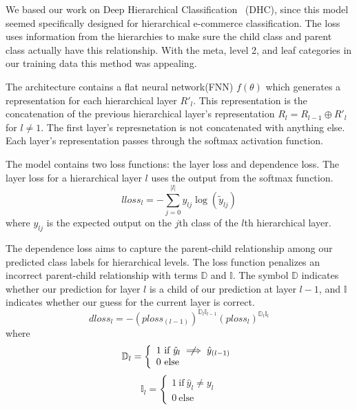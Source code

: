 \documentclass[conference]{IEEEtran}
\begin{document}
We based our work on Deep Hierarchical Classification~\cite{gao2020deep} (DHC), since this model seemed 
specifically designed for hierarchical e-commerce classification.
The loss uses information from the hierarchies to make sure the child class and parent class actually
have this relationship.
With the meta, level 2, and leaf categories in our training data this method was appealing.

The architecture contains a flat neural network(FNN) $f(\theta)$ which generates a representation 
for each hierarchical layer $R'_l$. 
This representation is the concatenation of the previous hierarchical layer's representation
$R_l = R_{l-1}\oplus R'_l$ for $ l\neq 1$. 
The first layer's represnetation is not concatenated with anything else.
Each layer's representation passes through the softmax activation function.

The model contains two loss functions: the layer loss and dependence loss.
The layer loss for a hierarchical layer $l$ uses the output from the softmax 
function. 
\begin{equation}
		lloss_l = -\sum_{j=0}^{|l|} y_{lj} \log (\tilde{y}_{lj})
		\label{eq:lloss}
\end{equation}
where $y_{lj}$ is the expected output on the $j$th class of the $l$th hierarchical layer.

The dependence loss aims to capture the parent-child relationship among our predicted class labels
for hierarchical levels.
The loss function penalizes an incorrect parent-child relationship with terms $\mathbb{D}$ and $\mathbb{I}$.
The symbol $\mathbb{D}$ indicates whether our prediction for layer $l$ is a child of our prediction at layer $l-1$,
and $\mathbb{I}$ indicates whether our guess for the current layer is correct.
\begin{equation}
		dloss_l = -(ploss_{(l-1)})^{\mathbb{D}_{l}\mathbb{I}_{l-1}}(ploss_l)^{\mathbb{D}_l\mathbb{I}_l}
\end{equation}
where
\begin{equation*}
	\mathbb{D}_l = \left\{
			\begin{array}{ll}
					1~\textrm{if}~\hat{y}_l\centernot\implies \hat{y}_{(l-1)} \\ 
					0~\textrm{else}
			\end{array}
			\right.
			\label{eq:d}
\end{equation*}
\begin{equation*}
	\mathbb{I}_l = \left\{
			\begin{array}{ll}
				1~\textrm{if}~\hat{y}_l\neq y_l \\
				0~\textrm{else}
			\end{array}
			\right.
			\label{eq:i}
\end{equation*}
\end{document}
